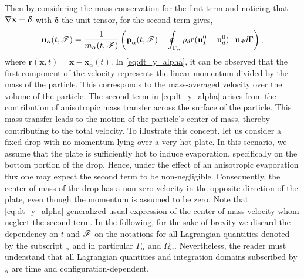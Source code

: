 Then by considering the mass conservation for the first term and noticing that $\mathbf{\nabla} \textbf{x} = \bm\delta$ with $\bm\delta$ the unit tensor, for the second term gives, 
\begin{equation}
    \textbf{u}_\alpha(t,\mathscr{F}) = \frac{1}{m_\alpha(t,\mathscr{F})} \left(
        \textbf{p}_\alpha(t,\mathscr{F})
        +  \oint_{\Gamma_\alpha} \rho_d \textbf{r} (\textbf{u}_I^0 - \textbf{u}_d^0)\cdot \textbf{n}_d  d\Gamma
        \right),
        \label{eq:dt_y_alpha}
\end{equation}
where $\textbf{r}(\textbf{x},t) = \textbf{x} - \textbf{x}_\alpha(t)$. 
In \ref{eq:dt_y_alpha}, it can be observed that the first component of the velocity represents the linear momentum divided by the mass of the particle. 
This corresponds to the mass-averaged velocity over the volume of the particle.
The second term in \ref{eq:dt_y_alpha} arises from the contribution of anisotropic mass transfer across the surface of the particle. 
This mass transfer leads to the motion of the particle's center of mass, thereby contributing to the total velocity.
To illustrate this concept, let us consider a fixed drop with no momentum lying over a very hot plate.
In this scenario, we assume that the plate is sufficiently hot to induce evaporation, specifically on the bottom portion of the drop.
Hence, under the effect of an anisotropic evaporation flux one may expect the second term to be non-negligible.
Consequently, the center of mass of the drop has a non-zero velocity in the opposite direction of the plate, even though the momentum is assumed to be zero.
Note that \ref{eq:dt_y_alpha} generalized usual expression of the center of mass velocity whom neglect the second term.
In the following, for the sake of brevity we discard the dependency on $t$ and $\mathscr{F}$ on the notations for all Lagrangian quantities denoted by the subscript $_\alpha$ and in particular $\Gamma_\alpha$ and $\Omega_\alpha$.
Nevertheless, the reader must understand that all Lagrangian quantities and integration domains subscribed by $_\alpha$ are time and configuration-dependent. 

